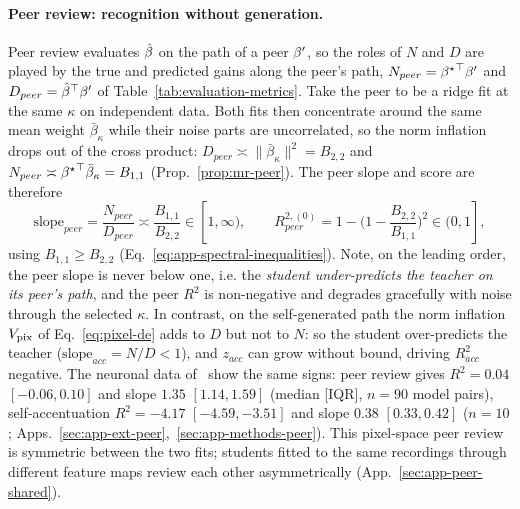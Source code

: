 \paragraph{Peer review: recognition without generation.}
Peer review evaluates $\hat{\beta}$ on the path of a peer ${\beta^{\prime}}$, so the roles of $N$ and $D$ are played by the true and predicted gains along the peer's path, $N_{peer}={{\beta^{\star}}}^\top{\beta^{\prime}}$ and $D_{peer}={\hat{\beta}}^\top{\beta^{\prime}}$ of Table~\ref{tab:evaluation-metrics}. Take the peer to be a ridge fit at the same $\kappa$ on independent data. Both fits then concentrate around the same mean weight $\bar\beta_\kappa$ while their noise parts are uncorrelated, so the norm inflation drops out of the cross product: $D_{peer}\asymp\|\bar\beta_\kappa\|^2=B_{2,2}$ and $N_{peer}\asymp{\beta^{\star}}^\top\bar\beta_\kappa=B_{1,1}$ (Prop.~\ref{prop:mr-peer}). The peer slope and score are therefore
\begin{equation}
\mathrm{slope}_{peer}=\frac{N_{peer}}{D_{peer}}\asymp\frac{B_{1,1}}{B_{2,2}}\in[1,\infty),
\qquad
R^{2,(0)}_{peer}=1-\Big(1-\frac{B_{2,2}}{B_{1,1}}\Big)^2\in(0,1],
\label{eq:peer-de}
\end{equation}
using $B_{1,1}\ge B_{2,2}$ (Eq.~\ref{eq:app-spectral-inequalities}). Note, on the leading order, the peer slope is never below one, i.e. the \textit{student under-predicts the teacher on its peer's path}, and the peer $R^2$ is non-negative and degrades gracefully with noise through the selected $\kappa$. In contrast, on the self-generated path the norm inflation $V_{\rm pix}$ of Eq.~\ref{eq:pixel-de} adds to $D$ but not to $N$:
so the student over-predicts the teacher ($\mathrm{slope}_{acc}=N/D<1$), and $z_{acc}$ can grow without bound, driving $R^2_{acc}$ negative.
The neuronal data of \citetPW\ show the same signs: peer review gives $R^2=0.04$ $[-0.06,0.10]$ and slope $1.35$ $[1.14,1.59]$ (median [IQR], $n=90$ model pairs), self-accentuation $R^2=-4.17$ $[-4.59,-3.51]$ and slope $0.38$ $[0.33,0.42]$ ($n=10$; Apps.~\ref{sec:app-ext-peer},~\ref{sec:app-methods-peer}). %
This pixel-space peer review is symmetric between the two fits; students fitted to the same recordings through different feature maps review each other asymmetrically (App.~\ref{sec:app-peer-shared}).

